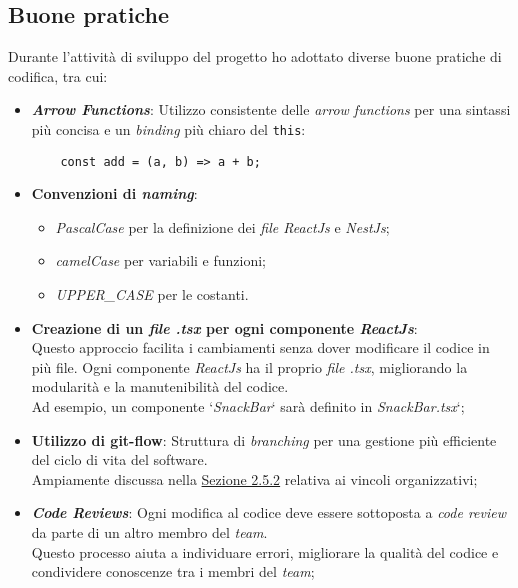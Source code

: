 \subsection{Buone pratiche}
\label{sez:best-practices}

Durante l'attività di sviluppo del progetto ho adottato diverse buone pratiche di codifica, tra cui:

\begin{itemize}
    \item \textbf{\textit{Arrow Functions}}: Utilizzo consistente delle \textit{arrow functions} per una sintassi più concisa e un \textit{binding} più chiaro del \texttt{this}:
    \begin{verbatim}
    const add = (a, b) => a + b;
     \end{verbatim}
    \item \textbf{Convenzioni di \textit{naming}}: 
    \begin{itemize}
        \item \textit{PascalCase} per la definizione dei \textit{file ReactJs} e \textit{NestJs};
        \item \textit{camelCase} per variabili e funzioni;
        \item \textit{UPPER\_CASE} per le costanti.
    \end{itemize}

    \item \textbf{Creazione di un \textit{file .tsx} per ogni componente \textit{ReactJs}}:\\
    Questo approccio facilita i cambiamenti senza dover modificare il codice in più file. 
    Ogni componente \textit{ReactJs} ha il proprio \textit{file .tsx}, migliorando la modularità e la manutenibilità del codice.\\
    Ad esempio, un componente ‘\textit{SnackBar}‘ sarà definito in \textit{SnackBar.tsx}‘;
    
    \item \textbf{Utilizzo di \gls{git-flow}}: Struttura di \textit{branching} per una gestione più efficiente del ciclo di vita del software.\\
    Ampiamente discussa nella {\hyperref[subsec:vincoli-organizzativi]{Sezione 2.5.2}} relativa ai vincoli organizzativi;

    \item \textbf{\textit{Code Reviews}}: Ogni modifica al codice deve essere sottoposta a \textit{code review} da parte di un altro membro del \textit{team}.\\
    Questo processo aiuta a individuare errori, migliorare la qualità del codice e condividere conoscenze tra i membri del \textit{team};    
\end{itemize}

